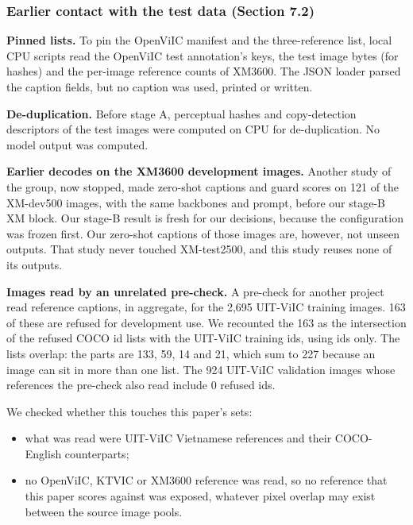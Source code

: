 \documentclass[manuscript,screen]{acmart}
\providecommand{\tightlist}{\setlength{\itemsep}{0pt}\setlength{\parskip}{0pt}}
\begin{document}
\subsubsection{Earlier contact with the test data (Section
7.2)}\label{earlier-contact-with-the-test-data-section-7.2}

\textbf{Pinned lists.} To pin the OpenViIC manifest and the three-reference list, local CPU scripts
read the OpenViIC test annotation's keys, the test image bytes (for hashes) and the per-image
reference counts of XM3600. The JSON loader parsed the caption fields, but no caption was used,
printed or written.

\textbf{De-duplication.} Before stage A, perceptual hashes and copy-detection descriptors of the
test images were computed on CPU for de-duplication. No model output was computed.

\textbf{Earlier decodes on the XM3600 development images.} Another study of the group, now stopped,
made zero-shot captions and guard scores on 121 of the XM-dev500 images, with the same backbones and
prompt, before our stage-B XM block. Our stage-B result is fresh for our decisions, because the
configuration was frozen first. Our zero-shot captions of those images are, however, not unseen
outputs. That study never touched XM-test2500, and this study reuses none of its outputs.

\textbf{Images read by an unrelated pre-check.} A pre-check for another project read reference
captions, in aggregate, for the 2,695 UIT-ViIC training images. 163 of these are refused for
development use. We recounted the 163 as the intersection of the refused COCO id lists with the
UIT-ViIC training ids, using ids only. The lists overlap: the parts are 133, 59, 14 and 21, which
sum to 227 because an image can sit in more than one list. The 924 UIT-ViIC validation images whose
references the pre-check also read include 0 refused ids.

We checked whether this touches this paper's sets:

\begin{itemize}
\tightlist
\item
  what was read were UIT-ViIC Vietnamese references and their COCO-English counterparts;
\item
  no OpenViIC, KTVIC or XM3600 reference was read, so no reference that this paper scores against
  was exposed, whatever pixel overlap may exist between the source image pools.
\end{itemize}
\end{document}
